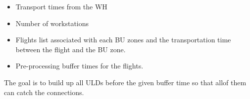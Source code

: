 \documentclass[11pt,a4paper,fleqn]{article}
\begin{document}
	\begin{itemize}
		\item Transport times from the WH
	\end{itemize}
	
	
	\begin{itemize}
		
		\item Number of workstations
		
		
	\end{itemize}
	
	\begin{itemize}
		
		\item Flights list associated with each BU zones and the transportation time between the flight and the BU zone.
		
		
	\end{itemize}
	
	\begin{itemize}
		
		\item Pre-processing buffer times for the flights.
		
		
	\end{itemize}
	
	The goal is to build up all ULDs before the given buffer time so that allof them can catch the connections.
	
\end{document}
